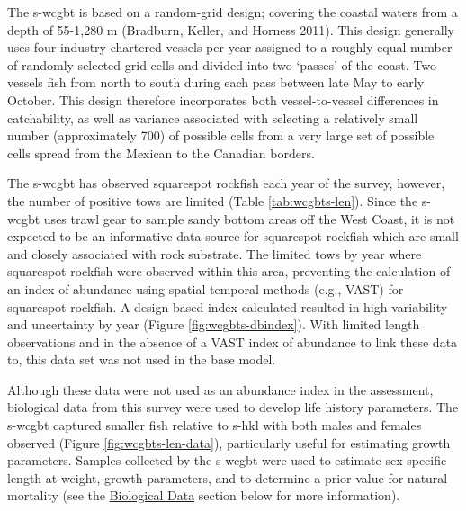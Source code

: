 \documentclass[11pt,
  english,
  a4paper,
]{article}
\begin{document}
The \gls{s-wcgbt} is based on a random-grid design; covering the coastal waters from a depth of 55-1,280 m {(Bradburn, Keller, and Horness 2011)\leavevmode\tagmcend\tagstructend}. This design generally uses four industry-chartered vessels per year assigned to a roughly equal number of randomly selected grid cells and divided into two `passes' of the coast. Two vessels fish from north to south during each pass between late May to early October. This design therefore incorporates both vessel-to-vessel differences in catchability, as well as variance associated with selecting a relatively small number (approximately 700) of possible cells from a very large set of possible cells spread from the Mexican to the Canadian borders.

\leavevmode\tagmcend\tagstructend\par


The \gls{s-wcgbt} has observed squarespot rockfish each year of the survey, however, the number of positive tows are limited (Table \ref{tab:wcgbts-len}). Since the \Gls{s-wcgbt} uses trawl gear to sample sandy bottom areas off the West Coast, it is not expected to be an informative data source for squarespot rockfish which are small and closely associated with rock substrate. The limited tows by year where squarespot rockfish were observed within this area, preventing the calculation of an index of abundance using spatial temporal methods (e.g., VAST) for squarespot rockfish. A design-based index calculated resulted in high variability and uncertainty by year (Figure \ref{fig:wcgbts-dbindex}). With limited length observations and in the absence of a VAST index of abundance to link these data to, this data set was not used in the base model.

\leavevmode\tagmcend\tagstructend\par


Although these data were not used as an abundance index in the assessment, biological data from this survey were used to develop life history parameters. The \gls{s-wcgbt} captured smaller fish relative to \gls{s-hkl} with both males and females observed (Figure \ref{fig:wcgbts-len-data}), particularly useful for estimating growth parameters. Samples collected by the \gls{s-wcgbt} were used to estimate sex specific length-at-weight, growth parameters, and to determine a prior value for natural mortality (see the {\protect\hyperlink{biological_data}{Biological Data}\leavevmode\tagmcend\tagstructend} section below for more information).
\end{document}

